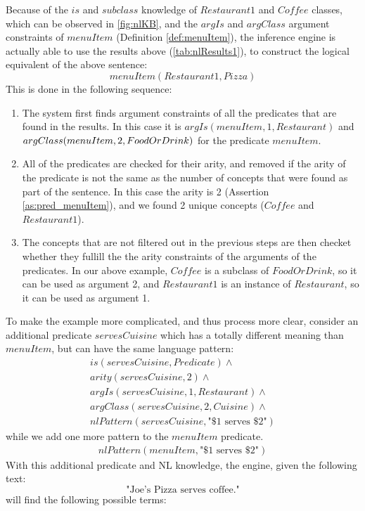 Because of the $is$ and $subclass$ knowledge of $Restaurant1$ and $Coffee$ 
classes, which can be observed in \autoref{fig:nlKB}, and the $argIs$ and 
$argClass$ argument constraints of $menuItem$ (Definition \ref{def:menuItem}), 
the inference engine is actually able to use the results above 
(\autoref{tab:nlResults1}), to construct the logical equivalent of the above 
sentence: 
\begin{equation*}
menuItem(Restaurant1, Pizza)
\end{equation*}
This is done in the following sequence:
\begin{enumerate}
\item The system first finds argument constraints of all the predicates that are
found in the results. In this case it is $argIs(menuItem,1,Restaurant)$ and
$argClass(menuItem,\\
2,FoodOrDrink)$ for the predicate $menuItem$.
\item All of the predicates are checked for their arity, and removed if the
arity of the predicate is not the same as the number of concepts that were found
as part of the sentence. In this case the arity is 2 (Assertion 
\ref{as:pred_menuItem}), and we found 2 unique concepts ($Coffee$ and 
$Restaurant1$).
\item The concepts that are not filtered out in the previous steps are then 
checket whether they fullill the the arity constraints of the arguments of the
predicates. In our above example, $Coffee$ is a subclass of $FoodOrDrink$, so
it can be used as argument 2, and $Restaurant1$ is an instance of $Restaurant$,
so it can be used as argument 1.
\end{enumerate}

To make the example more complicated, and thus process more clear, consider
an additional predicate $servesCuisine$ which has a totally different meaning
than $menuItem$, but can have the same language pattern:
\begin{equation*}
\begin{gathered}
    is(servesCuisine,Predicate) \land \\
	arity(servesCuisine,2)\land\\
	argIs(servesCuisine,1,Restaurant) \land\\
	argClass(servesCuisine,2, Cuisine) \land \\
	nlPattern(servesCuisine, \text{"\$1 serves \$2"}) 
\end{gathered}
\end{equation*}
while we add one more pattern to the $menuItem$ predicate.
\begin{equation*}
\begin{gathered}
	nlPattern(menuItem, \text{"\$1 serves \$2"}) 
\end{gathered}
\end{equation*}
With this additional predicate and NL knowledge, the engine, given the following
text:
\begin{equation}\label{nl:joespizzamenu1}
\text{"Joe's Pizza serves coffee."}
\end{equation}
will find the following possible terms:

